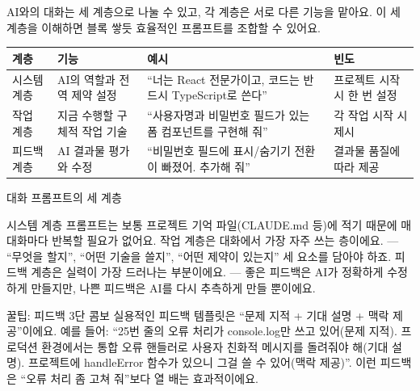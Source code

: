 


AI와의 대화는 세 계층으로 나눌 수 있고, 각 계층은 서로 다른 기능을 맡아요. 이 세 계층을 이해하면 블록 쌓듯 효율적인 프롬프트를 조합할 수 있어요.

\begin{center}
\begin{tabularx}{\linewidth}{|X|X|X|X|}
\hline
\textbf{계층} & \textbf{기능} & \textbf{예시} & \textbf{빈도} \tabularnewline
\hline
시스템 계층 & AI의 역할과 전역 제약 설정 & “너는 React 전문가이고, 코드는 반드시 TypeScript로 쓴다” & 프로젝트 시작 시 한 번 설정 \tabularnewline
작업 계층 & 지금 수행할 구체적 작업 기술 & “사용자명과 비밀번호 필드가 있는 폼 컴포넌트를 구현해 줘” & 각 작업 시작 시 제시 \tabularnewline
피드백 계층 & AI 결과물 평가와 수정 & “비밀번호 필드에 표시/숨기기 전환이 빠졌어. 추가해 줘” & 결과물 품질에 따라 제공 \tabularnewline
\hline
\end{tabularx}
\end{center}

\begin{center}\small\color{gray}대화 프롬프트의 세 계층\end{center}

시스템 계층 프롬프트는 보통 프로젝트 기억 파일(CLAUDE.md 등)에 적기 때문에 매 대화마다 반복할 필요가 없어요. 작업 계층은 대화에서 가장 자주 쓰는 층이에요. — “무엇을 할지”, “어떤 기술을 쓸지”, “어떤 제약이 있는지” 세 요소를 담아야 하죠. 피드백 계층은 실력이 가장 드러나는 부분이에요. — 좋은 피드백은 AI가 정확하게 수정하게 만들지만, 나쁜 피드백은 AI를 다시 추측하게 만들 뿐이에요.

\begin{tcbinfo}{꿀팁: 피드백 3단 콤보}
실용적인 피드백 템플릿은 “문제 지적 + 기대 설명 + 맥락 제공”이에요. 예를 들어: “25번 줄의 오류 처리가 console.log만 쓰고 있어(문제 지적). 프로덕션 환경에서는 통합 오류 핸들러로 사용자 친화적 메시지를 돌려줘야 해(기대 설명). 프로젝트에 handleError 함수가 있으니 그걸 쓸 수 있어(맥락 제공)”. 이런 피드백은 “오류 처리 좀 고쳐 줘”보다 열 배는 효과적이에요.

\end{tcbinfo}

